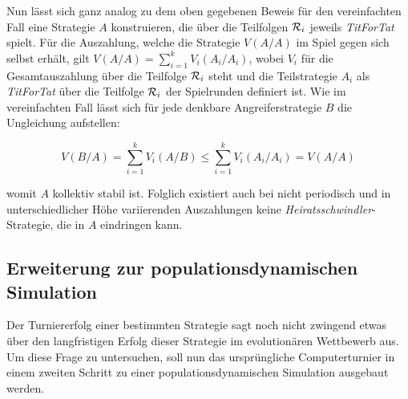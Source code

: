 \documentclass[12pt,a4paper,ngerman]{article}
\begin{document}
Nun lässt sich ganz analog zu dem oben gegebenen Beweis für den
vereinfachten Fall eine Strategie $A$ konstruieren, die über die
Teilfolgen ${\cal R}_i$ jeweils {\em TitForTat} spielt. Für die
Auszahlung, welche die Strategie $V(A/A)$ im Spiel gegen sich selbst
erhält, gilt $V(A/A) = \sum_{i=1}^k V_i(A_i/A_i)$, wobei $V_i$ für die
Gesamtauszahlung über die Teilfolge ${\cal R}_i$ steht und die
Teilstrategie $A_i$ als {\em TitForTat} über die Teilfolge
${\cal R}_i$ der Spielrunden definiert ist. Wie im vereinfachten Fall
lässt sich für jede denkbare Angreiferstrategie $B$ die Ungleichung
aufstellen:

\begin{displaymath}
V(B/A) = \sum_{i=1}^k V_i(A/B) \le \sum_{i=1}^k V_i(A_i/A_i) = V(A/A)
\end{displaymath}

womit $A$ kollektiv stabil ist. Folglich existiert auch bei nicht
periodisch und in unterschiedlicher Höhe variierenden Auszahlungen
keine {\em Heiratsschwindler}-Strategie, die in $A$ eindringen kann.


\subsection{Erweiterung zur populationsdynamischen Simulation}

Der Turniererfolg einer bestimmten Strategie sagt noch nicht zwingend
etwas über den langfristigen Erfolg dieser Strategie im evolutionären
Wettbewerb aus. Um diese Frage zu untersuchen, soll nun das
ursprüngliche Computerturnier in einem zweiten Schritt zu einer
populationsdynamischen Simulation ausgebaut werden.
\end{document}
